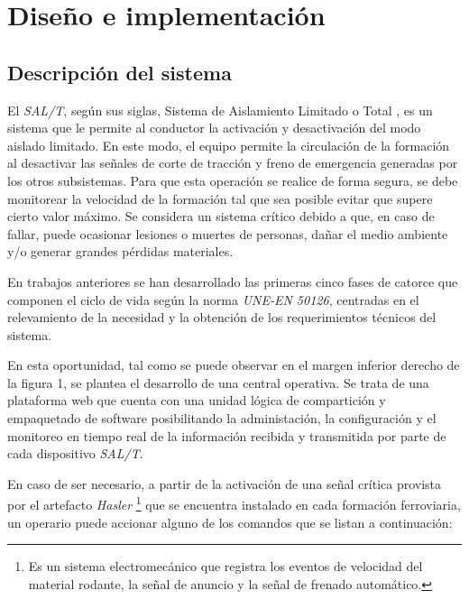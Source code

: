 \chapter{Diseño e implementación} %

\label{Chapter3} %

\section{Descripción del sistema}

El \textit{SAL/T}, según sus siglas, Sistema de Aislamiento Limitado o Total \citep{salt-physical-paper}, es un sistema que le permite al conductor la activación y desactivación del modo aislado limitado. En este modo, el equipo permite la circulación de la formación al desactivar las señales de corte de tracción y freno de emergencia generadas por los otros subsistemas. Para que esta operación se realice de forma segura, se debe monitorear la velocidad de la formación tal que sea posible evitar que supere cierto valor máximo. Se considera un sistema crítico debido a que, en caso de fallar, puede ocasionar lesiones o muertes de personas, dañar el medio ambiente y/o generar grandes pérdidas materiales.

En trabajos anteriores se han desarrollado las primeras cinco fases de catorce que componen el ciclo de vida según la norma \textit{UNE-EN 50126}, centradas en el relevamiento de la necesidad y la obtención de los requerimientos técnicos del sistema.

En esta oportunidad, tal como se puede observar en el margen inferior derecho de la figura 1, se plantea el desarrollo de una central operativa. Se trata de una plataforma web que cuenta con una unidad lógica de compartición y empaquetado de software posibilitando la administación, la configuración y el monitoreo en tiempo real de la información recibida y transmitida por parte de cada dispositivo \textit{SAL/T}. 

En caso de ser necesario, a partir de la activación de una señal crítica provista por el artefacto \textit{Hasler} \footnote{ Es un sistema electromecánico que registra los eventos de velocidad del material rodante, la señal de anuncio y la señal de frenado automático.
}  que se encuentra instalado en cada formación ferroviaria, un operario puede accionar alguno de los comandos que se listan a continuación:


